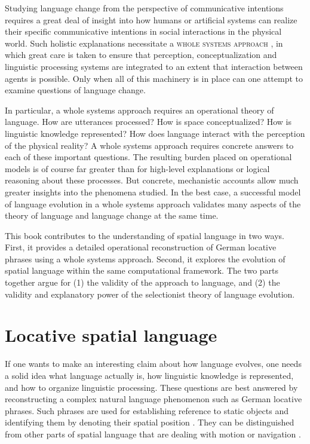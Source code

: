 Studying language change from the perspective of communicative
intentions requires a great deal of insight into how humans or artificial 
systems can realize their specific communicative intentions 
in social interactions in the physical world. Such holistic explanations 
necessitate a \textsc{whole systems approach}
\citep{steels2001language},
in which great care is taken to ensure that perception, conceptualization 
and linguistic processing systems are integrated to an extent that 
interaction between agents is possible. Only when all of this machinery is 
in place can one attempt to examine questions of language change.

In particular, a whole systems approach requires an operational theory of 
language. How are utterances processed? How is space conceptualized?
How is linguistic knowledge represented? How does language
interact with the perception of the physical reality? A whole systems approach 
requires concrete answers to each of these important questions. The resulting 
burden placed on operational models is of course far greater than for high-level 
explanations or logical reasoning about these processes. But concrete, 
mechanistic accounts allow much greater insights into the phenomena studied.
In the best case, a successful model of language evolution in a whole systems 
approach validates many aspects of the theory of language and language 
change at the same time.

This book contributes to the understanding of spatial language in two ways. 
First, it provides a detailed operational reconstruction of German locative phrases
using a whole systems approach. Second, it explores the evolution of spatial
language within the same computational framework. The two parts  
together argue for (1) the validity of the approach to language, and (2) the validity
and explanatory power of the selectionist theory of language evolution.


\section{Locative spatial language}
\label{s:intro-spatial-language}
If one wants to make an interesting claim about how language evolves, one needs a
solid idea what language actually is, how linguistic knowledge is represented, and
how to organize linguistic processing. These questions are best answered
by reconstructing a complex natural language phenomenon such as German locative 
phrases. Such phrases are used for establishing reference to 
static objects and identifying them by denoting their spatial position \citep{miller1976language}.
They can be distinguished from other parts of spatial language
that are dealing with motion or navigation \citep{eschenbach2004functional}. 


